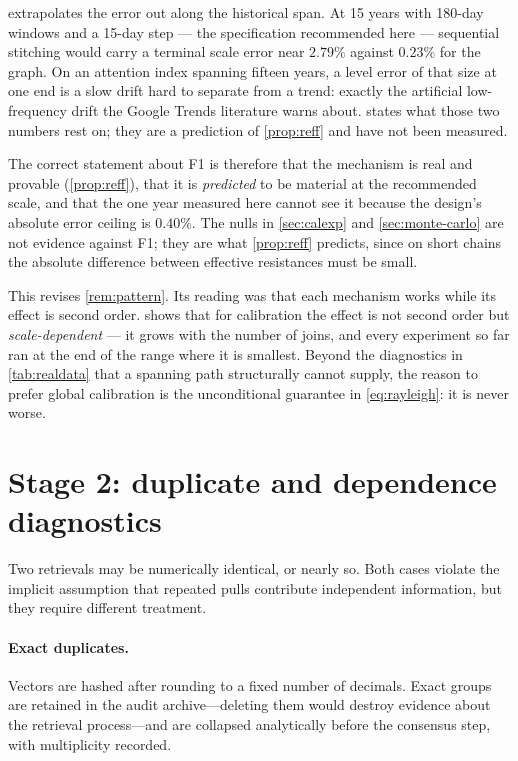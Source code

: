 \documentclass[12pt,a4paper,oneside]{article}
\begin{document}
\begin{remark}\label{rem:f1scale}
 extrapolates the error out along the historical span. At 15
years with 180-day windows and a 15-day step --- the specification recommended
here --- sequential stitching would carry a terminal scale error near $2.79\%$
against $0.23\%$ for the graph. On an attention index spanning fifteen years, a
level error of that size at one end is a slow drift hard to separate from a
trend: exactly the artificial low-frequency drift the Google Trends literature
warns about.  states what those two numbers rest on; they
are a prediction of \cref{prop:reff} and have not been measured.

The correct statement about F1 is therefore that the mechanism is real and
provable (\cref{prop:reff}), that it is \emph{predicted} to be material at the
recommended scale, and that the one year measured here cannot see it because the
design's absolute error ceiling is $0.40\%$. The nulls in \cref{sec:calexp} and \cref{sec:monte-carlo} are not
evidence against F1; they are what \cref{prop:reff} predicts, since on short
chains the absolute difference between effective resistances must be small.

This revises \cref{rem:pattern}. Its reading was that each mechanism works while
its effect is second order.  shows that for calibration the
effect is not second order but \emph{scale-dependent} --- it grows with the
number of joins, and every experiment so far ran at the end of the range where it
is smallest. Beyond the diagnostics in \cref{tab:realdata} that a spanning path
structurally cannot supply, the reason to prefer global calibration is the
unconditional guarantee in \eqref{eq:rayleigh}: it is never worse.
\end{remark}

\section{Stage 2: duplicate and dependence diagnostics}\label{sec:duplicates}

Two retrievals may be numerically identical, or nearly so. Both cases violate
the implicit assumption that repeated pulls contribute independent information,
but they require different treatment.

\paragraph{Exact duplicates.} Vectors are hashed after rounding to a fixed
number of decimals. Exact groups are retained in the audit archive---deleting
them would destroy evidence about the retrieval process---and are collapsed
analytically before the consensus step, with multiplicity recorded.
\end{document}
